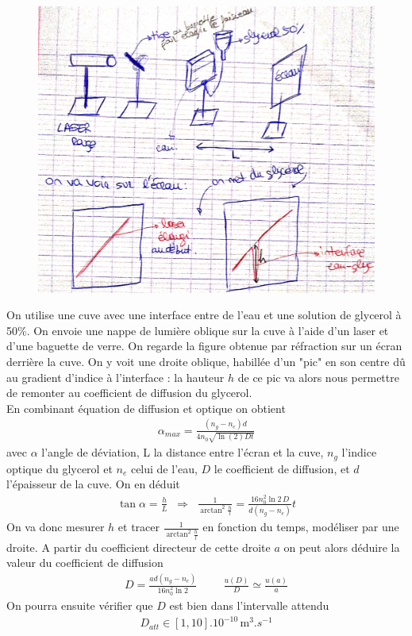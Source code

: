 \documentclass[12pt,prb,aps,epsf]{article}
\begin{document}
\begin{figure}[h]
\centerline{\includegraphics[width=13cm]{schema_diffusion}}
\end{figure}
On utilise une cuve avec une interface entre de l'eau et une solution de glycerol à 50\%. On envoie une nappe de lumière oblique sur la cuve à l'aide d'un laser et d'une baguette de verre. On regarde la figure obtenue par réfraction sur un écran derrière la cuve. On y voit une droite oblique, habillée d'un "pic" en son centre dû au gradient d'indice à l'interface : la hauteur $h$ de ce pic va alors nous permettre de remonter au coefficient de diffusion du glycerol.\\
En combinant équation de diffusion et optique on obtient 
\begin{eqnarray}
\alpha_{max} = \frac{(n_g-n_e)d}{4n_0\sqrt{\ln(2)Dt}}
\end{eqnarray}
avec $\alpha$ l'angle de déviation, L la distance entre l'écran et la cuve, $n_g$ l'indice optique du glycerol et $n_e$ celui de l'eau, $D$ le coefficient de diffusion, et $d$ l'épaisseur de la cuve. On en déduit 
\begin{eqnarray}
\tan \alpha = \frac{h}{L}\;\;\Rightarrow\;\; \frac{1}{\arctan^2{\frac{h}{l}}} = \frac{16n_0^2\ln2\,D}{d(n_g-n_e)}t
\end{eqnarray}
On va donc mesurer $h$ et tracer $\frac{1}{\arctan^2{\frac{h}{l}}}$ en fonction du temps, modéliser par une droite. A partir du coefficient directeur de cette droite $a$ on peut alors déduire la valeur du coefficient de diffusion
\begin{eqnarray}
D = \frac{ad(n_g-n_e)}{16n_0^2\ln2}\hspace{1cm} \frac{u(D)}{D} \simeq \frac{u(a)}{a}
\end{eqnarray}
On pourra ensuite vérifier que $D$ est bien dans l'intervalle attendu 
\begin{eqnarray}
D_{att} \in [1,10].10^{-10}\,\mathrm{m}^3.s^{-1}
\end{eqnarray}
\end{document}
